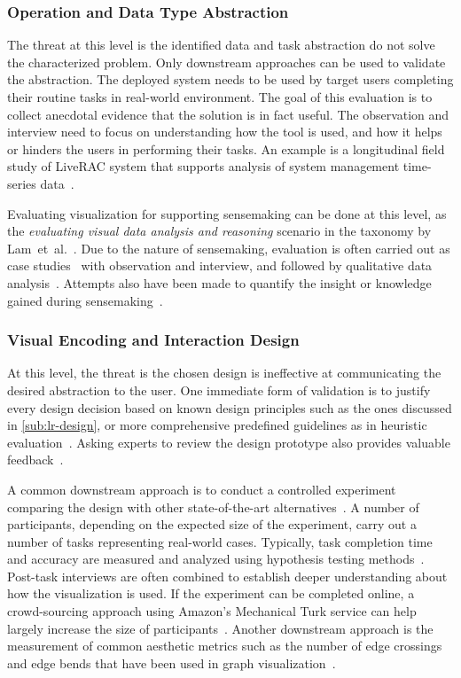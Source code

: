 \subsubsection{Operation and Data Type Abstraction}
The threat at this level is the identified data and task abstraction do not solve the characterized problem. Only downstream approaches can be used to validate the abstraction. The deployed system needs to be used by target users completing their routine tasks in real-world environment. The goal of this evaluation is to collect anecdotal evidence that the solution is in fact useful. The observation and interview need to focus on understanding how the tool is used, and how it helps or hinders the users in performing their tasks. An example is a longitudinal field study of LiveRAC system that supports analysis of system management time-series data~\cite{McLachlan2008}.

Evaluating visualization for supporting sensemaking can be done at this level, as the \emph{evaluating visual data analysis and reasoning} scenario in the taxonomy by Lam~et~al.~\cite{Lam2012}. Due to the nature of sensemaking, evaluation is often carried out as case studies~\cite{Kang2011} with observation and interview, and followed by qualitative data analysis~\cite{Lazar2010}. Attempts also have been made to quantify the insight or knowledge gained during sensemaking~\cite{Wilson2013}.

\subsubsection{Visual Encoding and Interaction Design}
At this level, the threat is the chosen design is ineffective at communicating the desired abstraction to the user. One immediate form of validation is to justify every design decision based on known design principles such as the ones discussed in \autoref{sub:lr-design}, or more comprehensive predefined guidelines as in heuristic evaluation~\cite{Zuk2006}. Asking experts to review the design prototype also provides valuable feedback~\cite{Tory2005}.

A common downstream approach is to conduct a controlled experiment comparing the design with other state-of-the-art alternatives~\cite{Xu2012}. A number of participants, depending on the  expected size of the experiment, carry out a number of tasks representing real-world cases. Typically, task completion time and accuracy are measured and analyzed using hypothesis testing methods~\cite{Field2003}. Post-task interviews are often combined to establish deeper understanding about how the visualization is used. If the experiment can be completed online, a crowd-sourcing approach using Amazon's Mechanical Turk service can help largely increase the size of participants~\cite{Heer2010a}. Another downstream approach is the measurement of common aesthetic metrics such as the number of edge crossings and edge bends that have been used in graph visualization~\cite{Sugiyama1981}.

